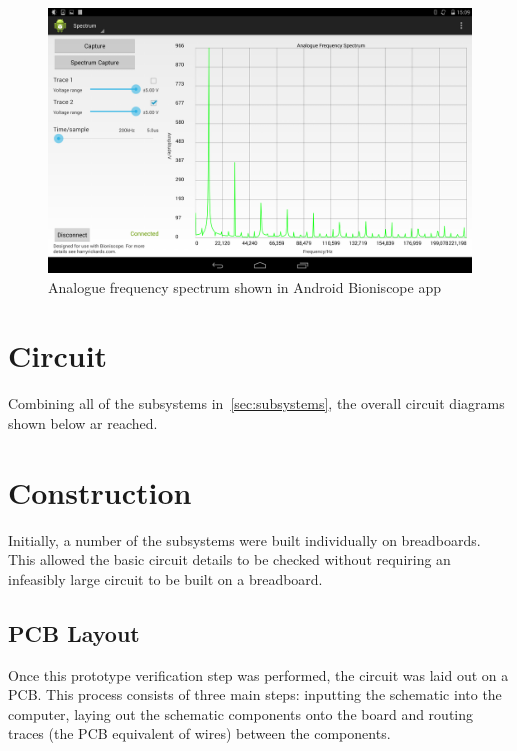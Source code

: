 \begin{landscape}
  \begin{figure}[h]
    \includegraphics[width=\linewidth]{img/screenshots/spectrum.png}
    \caption{Analogue frequency spectrum shown in Android Bioniscope app}
    \label{fig:spectrumScreenshot}
  \end{figure}
\end{landscape}


\section{Circuit}
Combining all of the subsystems in~\cref{sec:subsystems}, the overall circuit
diagrams shown below ar reached.





\section{Construction}
Initially, a number of the subsystems were built individually on breadboards.
This allowed the basic circuit details to be checked without requiring an
infeasibly large circuit to be built on a breadboard. 

\subsection{PCB Layout}
Once this prototype verification step was performed, the circuit was laid out on a
PCB. This process consists of three main steps: inputting the schematic
into the computer, laying out the schematic components onto the board and
routing traces (the PCB equivalent of wires) between the components.

